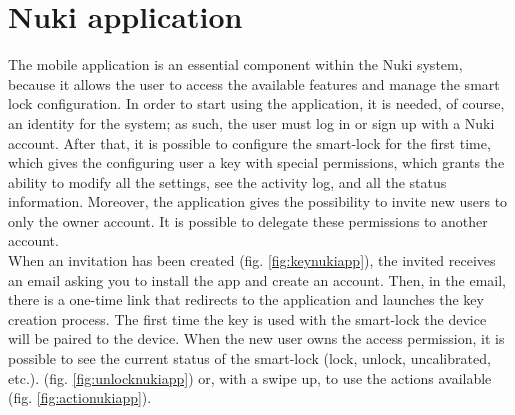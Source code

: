 \section{Nuki application}
The mobile application is an essential component within the Nuki system, because it allows the user to access the available features and manage the smart lock configuration. In order to start using the application, it is needed, of course, an identity for the system; as such, the user must log in or sign up with a Nuki account. After that, it is possible to configure the smart-lock for the first time, which gives the configuring user a key with special permissions, which grants the ability to modify all the settings, see the activity log, and all the status information. Moreover, the application gives the possibility to invite new users to only the owner account. It is possible to delegate these permissions to another account.
\\ When an invitation has been created (fig. \ref{fig:keynukiapp}), the invited receives an email asking you to install the app and create an account. Then, in the email, there is a one-time link that redirects to the application and launches the key creation process. The first time the key is used with the smart-lock the device will be paired to the device. When the new user owns the access permission, it is possible to see the current status of the smart-lock (lock, unlock, uncalibrated, etc.). (fig. \ref{fig:unlocknukiapp}) or, with a swipe up, to use the actions available (fig. \ref{fig:actionukiapp}). 

